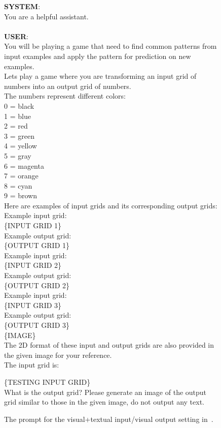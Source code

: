 \begin{figure*}
  \begin{tcolorbox}
  \textbf{SYSTEM}:\\
  You are a helpful assistant.\\\\
  \textbf{USER}: \\
        You will be playing a game that need to find common patterns from input examples and apply the pattern for prediction on new examples.\\
Lets play a game where you are transforming an input grid of numbers into an output grid of numbers.\\

The numbers represent different colors:\\
0 = black\\
1 = blue\\
2 = red\\
3 = green\\
4 = yellow\\
5 = gray\\
6 = magenta\\
7 = orange\\
8 = cyan\\
9 = brown\\

Here are examples of input grids and its corresponding output grids:\\
Example input grid:\\
\{INPUT GRID 1\} \\
Example output grid:\\
\{OUTPUT GRID 1\} \\

Example input grid:\\
\{INPUT GRID 2\} \\
Example output grid:\\
\{OUTPUT GRID 2\} \\

Example input grid:\\
\{INPUT GRID 3\} \\
Example output grid:\\
\{OUTPUT GRID 3\} \\

\{IMAGE\} \\

The 2D format of these input and output grids are also provided in the given image for your reference. \\

The input grid is:

\{TESTING INPUT GRID\} \\

What is the output grid? Please generate an image of the output grid similar to those in the given image, do not output any text.


    \end{tcolorbox}
    \caption{The prompt for the visual+textual input/visual output setting in~.}
    \label{fig:visual+textual prompt}
\end{figure*}



